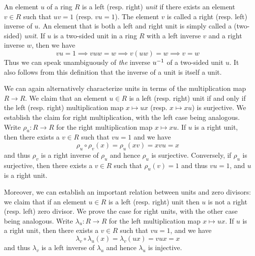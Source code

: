 \begin{example}
    \label{ex:field}
    An element \(u\) of a ring \(R\) is a left (resp. right) \emph{unit} if
    there exists an element \(v \in R\) such that \(uv = 1\) (resp. \(vu = 1\)).
    The element \(v\) is called a right (resp. left) inverse of \(u\). An
    element that is both a left and right unit is simply called a (two-sided)
    \emph{unit}. If \(u\) is a two-sided unit in a ring \(R\) with a left
    inverse \(v\) and a right inverse \(w\), then we have
    \[
        vu = 1 \implies vuw = w \implies v(uw) = w \implies v = w
    \]
    Thus we can speak unambiguously of \emph{the} inverse \(u^{-1}\) of a
    two-sided unit \(u\). It also follows from this definition that the inverse
    of a unit is itself a unit.

    We can again alternatively characterize units in terms of the multiplication
    map \(R \to R\). We claim that an element \(u \in R\) is a left (resp.
    right) unit if and only if the left (resp. right) multiplication map \(x
    \mapsto ux\) (resp. \(x \mapsto xu\)) is surjective. We establish the claim
    for right multiplication, with the left case being analogous. Write \(\rho_u
    : R \to R\) for the right multiplication map \(x \mapsto xu\). If \(u\) is a
    right unit, then there exists a \(v \in R\) such that \(vu = 1\) and we have
    \[
        \rho_u \circ \rho_v(x) = \rho_u(xv) = xvu = x
    \]
    and thus \(\rho_v\) is a right inverse of \(\rho_u\) and hence \(\rho_u\) is
    surjective. Conversely, if \(\rho_u\) is surjective, then there exists a \(v
    \in R\) such that \(\rho_u(v) = 1\) and thus \(vu = 1\), and \(u\) is a
    right unit.

    Moreover, we can establish an important relation between units and zero
    divisors: we claim that if an element \(u \in R\) is a left (resp. right)
    unit then \(u\) is not a right (resp. left) zero divisor. We prove the case
    for right units, with the other case being analogous. Write \(\lambda_u : R
    \to R\) for the left multiplication map \(x \mapsto ux\). If \(u\) is a
    right unit, then there exists a \(v \in R\) such that \(vu = 1\), and we
    have
    \[
        \lambda_v \circ \lambda_u(x) = \lambda_v(ux) = vux = x
    \]
    and thus \(\lambda_v\) is a left inverse of \(\lambda_u\) and hence
    \(\lambda_u\) is injective. 


\end{example}
